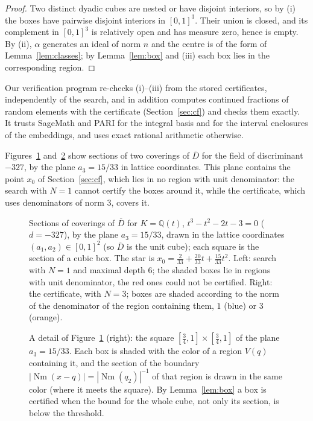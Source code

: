 \documentclass[11pt]{amsart}
\theoremstyle{definition}
\theoremstyle{remark}
\numberwithin{equation}{section}
\newcommand{\Q}{\mathbb{Q}}
\newcommand{\Nm}{\operatorname{Nm}}
\begin{document}
\begin{proof}
Two distinct dyadic cubes are nested or have disjoint interiors, so by (i) the boxes have
pairwise disjoint interiors in $[0,1]^3$. Their union is closed, and its complement in $[0,1]^3$
is relatively open and has measure zero, hence is empty. By (ii), $\alpha$ generates an ideal of
norm $n$ and the centre is of the form of Lemma~\ref{lem:classes}; by Lemma~\ref{lem:box} and
(iii) each box lies in the corresponding region.
\end{proof}

Our verification program re-checks (i)--(iii) from the stored certificates, independently of
the search, and in addition computes continued fractions of random elements with the
certificate (Section~\ref{sec:cf}) and checks them exactly. It trusts SageMath and PARI for
the integral basis and for the interval enclosures of the embeddings, and uses exact rational
arithmetic otherwise.

Figures~\ref{fig:slices} and~\ref{fig:zoom3} show sections of two coverings of $\overline D$
for the field of discriminant $-327$, by the plane $a_3=15/33$ in lattice coordinates. This
plane contains the point $x_0$ of Section~\ref{sec:cf}, which lies in no region with unit
denominator: the search with $N=1$ cannot certify the boxes around it, while the certificate,
which uses denominators of norm $3$, covers it.

\begin{figure}[ht]
\centering

\caption{Sections of coverings of $\overline D$ for $K=\Q(t)$, $t^3-t^2-2t-3=0$ ($d=-327$), by
the plane $a_3=15/33$, drawn in the lattice coordinates $(a_1,a_2)\in[0,1]^2$ (so $\overline D$
is the unit cube); each square is the section of a cubic box. The star is
$x_0=\frac{2}{33}+\frac{20}{33}t+\frac{15}{33}t^2$. Left: search with $N=1$ and maximal depth
$6$; the shaded boxes lie in regions with unit denominator, the red ones could not be certified.
Right: the certificate, with $N=3$; boxes are shaded according to the norm of the denominator of
the region containing them, $1$ (blue) or $3$ (orange).}
\label{fig:slices}
\end{figure}

\begin{figure}[ht]
\centering

\caption{A detail of Figure~\ref{fig:slices} (right): the square
$[\frac34,1]\times[\frac34,1]$ of the plane $a_3=15/33$. Each box is shaded with the color of a
region $V(q)$ containing it, and the section of the boundary $|\Nm(x-q)|=|\Nm(q_2)|^{-1}$ of that
region is drawn in the same color (where it meets the square). By Lemma~\ref{lem:box} a box is
certified when the bound for the whole cube, not only its section, is below the threshold.}
\label{fig:zoom3}
\end{figure}
\end{document}
